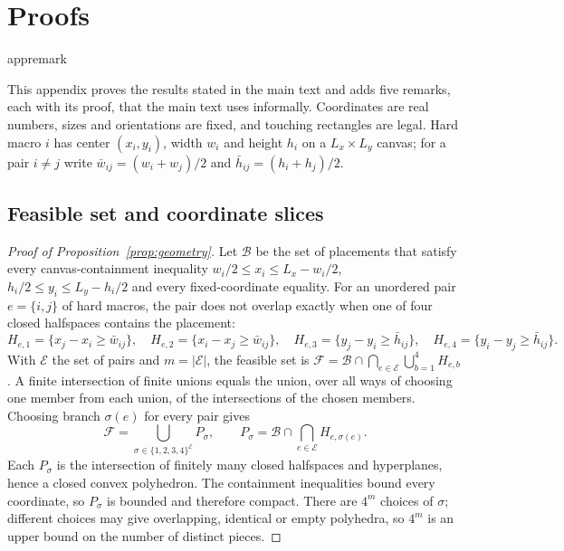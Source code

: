 \section{Proofs}\label{app:proofs}

\ifcsname appremark\endcsname\else
  \theoremstyle{remark}
  \newtheorem{appremark}{Remark}[section]
  \theoremstyle{plain}
\fi

This appendix proves the results stated in the main text and adds five remarks,
each with its proof, that the main text uses informally. Coordinates are real
numbers, sizes and orientations are fixed, and touching rectangles are legal.
Hard macro $i$ has center $(x_i,y_i)$, width $w_i$ and height $h_i$ on a
$L_x\times L_y$ canvas; for a pair $i\ne j$ write
$\bar w_{ij}=(w_i+w_j)/2$ and $\bar h_{ij}=(h_i+h_j)/2$.

\subsection{Feasible set and coordinate slices}

\begin{proof}[Proof of Proposition~\ref{prop:geometry}]
Let $\mathcal B$ be the set of placements that satisfy every canvas-containment
inequality $w_i/2\le x_i\le L_x-w_i/2$, $h_i/2\le y_i\le L_y-h_i/2$ and every
fixed-coordinate equality. For an unordered pair $e=\{i,j\}$ of hard macros, the
pair does not overlap exactly when one of four closed halfspaces contains the
placement:
\begin{equation*}
 H_{e,1}=\{x_j-x_i\ge\bar w_{ij}\},\quad
 H_{e,2}=\{x_i-x_j\ge\bar w_{ij}\},\quad
 H_{e,3}=\{y_j-y_i\ge\bar h_{ij}\},\quad
 H_{e,4}=\{y_i-y_j\ge\bar h_{ij}\}.
\end{equation*}
With $\mathcal E$ the set of pairs and $m=|\mathcal E|$, the feasible set is
$\mathcal F=\mathcal B\cap\bigcap_{e\in\mathcal E}\bigcup_{b=1}^4H_{e,b}$. A finite
intersection of finite unions equals the union, over all ways of choosing one member
from each union, of the intersections of the chosen members. Choosing branch
$\sigma(e)$ for every pair gives
\begin{equation*}
 \mathcal F=\bigcup_{\sigma\in\{1,2,3,4\}^{\mathcal E}}P_\sigma,\qquad
 P_\sigma=\mathcal B\cap\bigcap_{e\in\mathcal E}H_{e,\sigma(e)}.
\end{equation*}
Each $P_\sigma$ is the intersection of finitely many closed halfspaces and
hyperplanes, hence a closed convex polyhedron. The containment inequalities bound
every coordinate, so $P_\sigma$ is bounded and therefore compact. There are $4^m$
choices of $\sigma$; different choices may give overlapping, identical or empty
polyhedra, so $4^m$ is an upper bound on the number of distinct pieces.
\end{proof}

